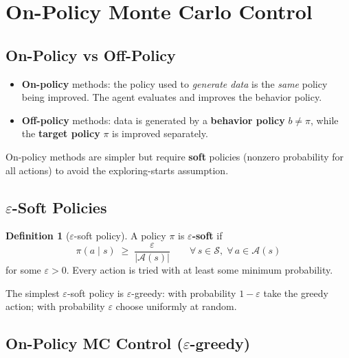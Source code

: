 \documentclass[11pt,a4paper]{article}
\theoremstyle{definition}
\newtheorem{definition}{Definition}[section]
\theoremstyle{plain}
\theoremstyle{remark}
\begin{document}
\section{On-Policy Monte Carlo Control}

\subsection{On-Policy vs Off-Policy}

\begin{itemize}
    \item \textbf{On-policy} methods: the policy used to \textit{generate data} is the \textit{same} policy being improved. The agent evaluates and improves the behavior policy.
    \item \textbf{Off-policy} methods: data is generated by a \textbf{behavior policy} $b \neq \pi$, while the \textbf{target policy} $\pi$ is improved separately.
\end{itemize}

On-policy methods are simpler but require \textbf{soft} policies (nonzero probability for all actions) to avoid the exploring-starts assumption.

\subsection{$\varepsilon$-Soft Policies}

\begin{definition}[$\varepsilon$-soft policy]
A policy $\pi$ is \textbf{$\varepsilon$-soft} if
\[
    \pi(a \mid s) \;\geq\; \frac{\varepsilon}{|\mathcal{A}(s)|} \qquad \forall\, s \in \mathcal{S},\; \forall\, a \in \mathcal{A}(s)
\]
for some $\varepsilon > 0$. Every action is tried with at least some minimum probability.
\end{definition}

The simplest $\varepsilon$-soft policy is $\varepsilon$-greedy: with probability $1 - \varepsilon$ take the greedy action; with probability $\varepsilon$ choose uniformly at random.

\subsection{On-Policy MC Control ($\varepsilon$-greedy)}
\end{document}
